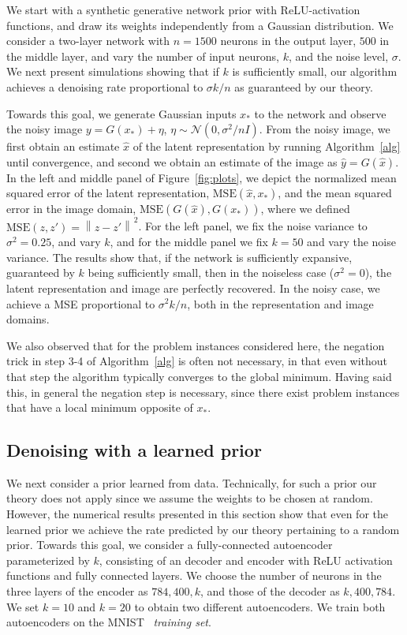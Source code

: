 \documentclass[11pt]{article}
\newcommand{\xo}{x_\ast}
\newcommand{\noise}{\eta}
\newcommand{\Tnorm}{}
\newcommand\norm[2][\Tnorm]{\ensuremath{{\left\|#2\right\|}_{#1}}}
\newcommand{\MSE}{\mathrm{MSE}}
\begin{document}
We start with a synthetic generative network prior with ReLU-activation functions, and draw its weights independently from a Gaussian distribution.
We consider a two-layer network with $n=1500$ neurons in the output layer, $500$ in the middle layer, and vary the number of input neurons, $k$, and the noise level, $\sigma$.
We next present simulations showing that if $k$ is sufficiently small, our algorithm achieves a denoising rate proportional to $\sigma k/n$ as guaranteed by our theory.

Towards this goal, we generate Gaussian inputs $\xo$ to the network and observe the noisy image $y = G(\xo) + \noise$, $\noise \sim \mathcal N(0,\sigma^2/n I)$.
From the noisy image, we first obtain an estimate $\hat x$ of the latent representation by running Algorithm~\ref{alg} until convergence, and second we obtain an estimate of the image as $\hat y = G(\hat x)$.
In the left and middle panel of Figure~\ref{fig:plots}, we depict the normalized mean squared error of the latent representation,
$\MSE(\hat x, \xo)$, and the mean squared error in the image domain, $\MSE(G(\hat x), G(\xo))$, where we defined
$\MSE(z, z') = \norm{z - z'}^2$.
For the left panel, we fix the noise variance to $\sigma^2=0.25$, and vary $k$, and for the middle panel we fix $k=50$ and vary the noise variance.
The results show that, if the network is sufficiently expansive, guaranteed by $k$ being sufficiently small, then in the noiseless case ($\sigma^2 = 0$), the latent representation and image are perfectly recovered. In the noisy case, we achieve a MSE proportional to $\sigma^2k/n$, both in the representation and image domains.

We also observed that for the problem instances considered here, the negation trick in step 3-4 of Algorithm~\ref{alg} is often not necessary, in that even without that step the algorithm typically converges to the global minimum.
Having said this, in general the negation step is necessary,  since there exist problem instances that have a local minimum opposite of $\xo$.

\subsection{Denoising with a learned prior}

We next consider a prior learned from data. Technically, for such a prior our theory does not apply since we assume the weights to be chosen at random.
However, the numerical results presented in this section show that even for the learned prior we achieve the rate predicted by our theory pertaining to a random prior.
Towards this goal, we consider a  fully-connected autoencoder parameterized by $k$, consisting of an decoder and encoder with ReLU activation functions and fully connected layers. We choose the number of neurons in the three layers of the encoder as $784,400,k$, and those of the decoder as $k,400,784$.
We set $k = 10$ and $k=20$ to obtain two different autoencoders.
We train both autoencoders on the MNIST~\citep{lecun_gradient-based_1998} \emph{training set}.
\end{document}

